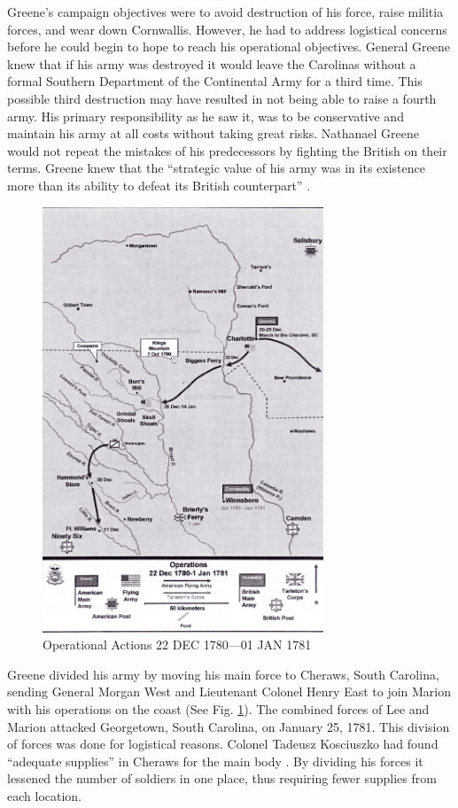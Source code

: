 Greene’s campaign objectives were to avoid destruction of his force, raise
militia forces, and wear down Cornwallis.  However, he had to address logistical
concerns before he could begin to hope to reach his operational objectives.
General Greene knew that if his army was destroyed it would leave the Carolinas
without a formal Southern Department of the Continental Army for a third time.
This possible third destruction may have resulted in not being able to raise a
fourth army.  His primary responsibility as he saw it, was to be conservative
and maintain his army at all costs without taking great risks. Nathanael Greene
would not repeat the mistakes of his predecessors by fighting the British on
their terms.   Greene knew that the “strategic value of his army was in its
existence more than its ability to defeat its British counterpart”
\cite[p.66]{woodward_comparative_2002}.

\begin{figure}[ht]
\begin{center}
\includegraphics[height=5in]{gfx/Nicholson4}
\end{center}
\caption{Operational Actions 22 DEC 1780---01 JAN 1781 \cite[Tab D, Map 6]{rauch_battle_2007}}
\label{Nicholson4}
\end{figure}

Greene divided his army by moving his main force to Cheraws, South Carolina,
sending General Morgan West and Lieutenant Colonel Henry East to join Marion
with his operations on the coast (See Fig. \ref{Nicholson4}).  The combined
forces of Lee and Marion attacked Georgetown, South Carolina, on January 25, 1781.  This
division of forces was done for logistical reasons.  Colonel Tadeusz Kosciuszko
had found “adequate supplies” in Cheraws for the main body \cite[p.23]{moncure_cowpens_1996}.
By dividing his forces it lessened the number of soldiers in one place, thus
requiring fewer supplies from each location.  

